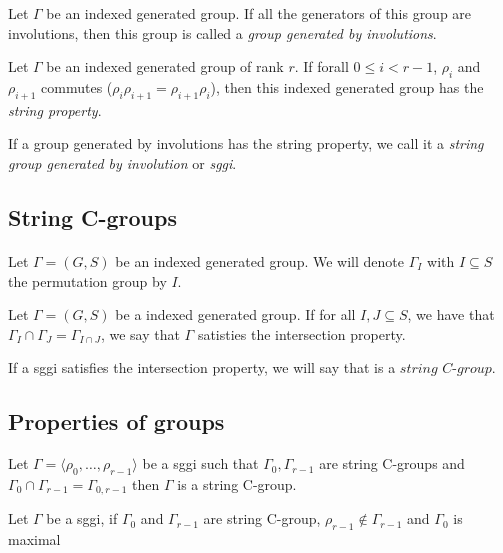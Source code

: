 \begin{definition}
  Let $\Gamma$ be an indexed generated group. If all the generators of this group are involutions, then this group is called a \textit{group generated by involutions}.
\end{definition}

\begin{definition}
  Let $\Gamma$ be an indexed generated group of rank $r$. If forall $0 \le i < r-1$, $\rho_i$ and $\rho_{i+1}$ commutes ($\rho_i \rho_{i+1} = \rho_{i+1}\rho_i$), then this indexed generated group has the \textit{string property}.
\end{definition}

\begin{definition}
  If a group generated by involutions has the string property, we call it a \textit{string group generated by involution} or \textit{sggi}.
\end{definition}

\subsection{String C-groups}

\paragraph{}
Let $\Gamma = (G,S)$ be an indexed generated group. We will denote $\Gamma_I$ with $I \subseteq S$ the permutation group by $I$.

\begin{definition}
  Let $\Gamma = (G,S)$ be a indexed generated group. If for all $I, J \subseteq S$, we have that $\Gamma_I \cap \Gamma_J = \Gamma_{I \cap J}$, we say that $\Gamma$ satisties the intersection property.
\end{definition}

\begin{definition}
  If a sggi satisfies the intersection property, we will say that is a $\textit{string C-group}$.
\end{definition}

\subsection{Properties of groups}

\begin{property}
  Let $\Gamma = \langle \rho_0, \dots, \rho_{r-1} \rangle$ be a sggi such that $\Gamma_0, \Gamma_{r-1}$ are string C-groups and $\Gamma_0 \cap \Gamma_{r-1} = \Gamma_{0,r-1}$ then $\Gamma$ is a string C-group.
\end{property}

\begin{property}
  Let $\Gamma$ be a sggi, if $\Gamma_0$ and $\Gamma_{r-1}$ are string C-group, $\rho_{r-1} \notin \Gamma_{r-1}$ and $\Gamma_0$ is maximal
\end{property}

